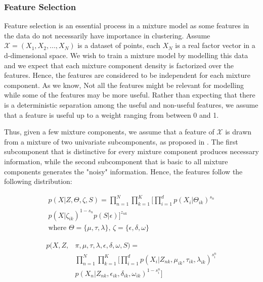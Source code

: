\documentclass[letterpaper]{article}
\begin{document}
\subsubsection{Feature Selection}

Feature selection is an essential process in a mixture model as
some features in the data do not necessarily have importance in clustering. 
Assume $\mathcal{X}=(X_1, X_2, ..., X_N)$ is a dataset of points, each $X_N $ is a real 
factor vector in a d-dimensional space. We wish to train a mixture model by modelling this data and we expect that each mixture component density is factorized over the features. Hence, the features are considered to be independent for each mixture component. 
As we know, Not all the features might be relevant for modelling while some of the features may be more useful. Rather than expecting that there is a deterministic separation among the useful and non-useful features, 
we assume that a feature is useful up to a weight ranging from between 0 and 1. 

Thus, given a few mixture components, we assume that a feature of $\mathcal{X}$ is drawn from a mixture of two univariate subcomponents, as proposed in \cite{law2004simultaneous}. The first 
subcomponent that is distinctive for every mixture component produces necessary information, while the second subcomponent that is basic to all mixture components generates the "noisy" information.
Hence, the features follow the following distribution:

\begin{equation}
    \begin{split}
        p(X|Z, \Theta,\zeta, S) = \prod_{n=1}^N\prod_{k=1}^K\bigg[\prod_{i=1}^d p(X_i|\Theta_{ik})^{s_n} \\
        p(X|\zeta_{ik})^{1-s_n}p(S|\epsilon)\bigg]^{z_{nk}} \\
        \text{where $\Theta=\{\mu, \tau, \lambda\}$, $\zeta=\{\epsilon, \delta, \omega\}$}
    \end{split}
\end{equation}

\begin{equation}
    \begin{split}
        p(X, Z,& \pi, \mu, \tau, \lambda, \epsilon, \delta, \omega, S) =\\ &\prod_{n=1}^N\prod_{k=1}^K\bigg[\prod_{i=1}^d {p(X_i|Z_{nk}, \mu_{ik}, \tau_{ik}, \lambda_{ik})}^{s_i^n}\\
        &{p(X_n|Z_{nk}, \epsilon_{ik}, \delta_{ik}, \omega_{ik})}^{1-s_i^n}\bigg]
    \end{split}
\end{equation}
\end{document}
